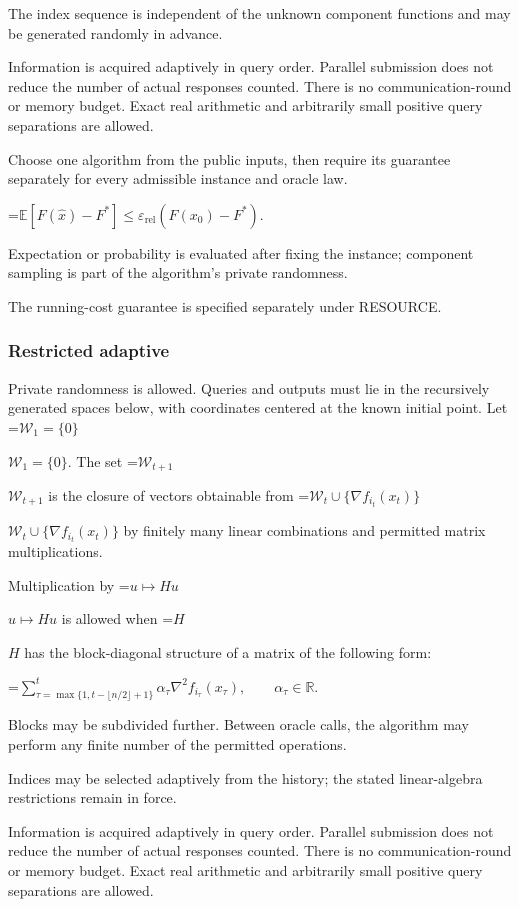 \documentclass[10pt,a4paper]{article}
\newcommand{\AtlasMath}[1]{\par\begingroup\centering\setbox0=\hbox{$\displaystyle #1$}\ifdim\wd0>1.4\linewidth\typeout{ATLAS WIDE FORMULA: \the\wd0}\fi\ifdim\wd0>\linewidth\resizebox{\linewidth}{!}{\box0}\else\box0\fi\par\endgroup}
\newcommand{\AtlasInlineMath}[1]{\begingroup\setbox0=\hbox{$#1$}\ifdim\wd0>.4\linewidth\endgroup\AtlasMath{#1}\else\endgroup$#1$\fi}
\begin{document}
The index sequence is independent of the unknown component functions and may be generated randomly in advance.

Information is acquired adaptively in query order. Parallel submission does not reduce the number of actual responses counted. There is no communication-round or memory budget. Exact real arithmetic and arbitrarily small positive query separations are allowed.

Choose one algorithm from the public inputs, then require its guarantee separately for every admissible instance and oracle law.


\AtlasMath{\mathbb{E}\!\left[F(\widehat{x})-F^*\right]\le \varepsilon_{\mathrm{rel}}(F(x_0)-F^*).}


Expectation or probability is evaluated after fixing the instance; component sampling is part of the algorithm's private randomness.

The running-cost guarantee is specified separately under RESOURCE.

\subsubsection{Restricted adaptive}
Private randomness is allowed. Queries and outputs must lie in the recursively generated spaces below, with coordinates centered at the known initial point. Let \AtlasInlineMath{\mathcal{W}_1=\{0\}}. The set \AtlasInlineMath{\mathcal{W}_{t+1}} is the closure of vectors obtainable from \AtlasInlineMath{\mathcal{W}_t\cup\{\nabla f_{i_t}(x_t)\}} by finitely many linear combinations and permitted matrix multiplications.

Multiplication by \AtlasInlineMath{u\mapsto Hu} is allowed when \AtlasInlineMath{H} has the block-diagonal structure of a matrix of the following form:


\AtlasMath{\sum_{\tau=\max\{1,t-\lfloor n/2\rfloor+1\}}^{t}\alpha_\tau\nabla^2f_{i_\tau}(x_\tau),\qquad\alpha_\tau\in\mathbb{R}.}


Blocks may be subdivided further. Between oracle calls, the algorithm may perform any finite number of the permitted operations.

Indices may be selected adaptively from the history; the stated linear-algebra restrictions remain in force.

Information is acquired adaptively in query order. Parallel submission does not reduce the number of actual responses counted. There is no communication-round or memory budget. Exact real arithmetic and arbitrarily small positive query separations are allowed.
\end{document}
